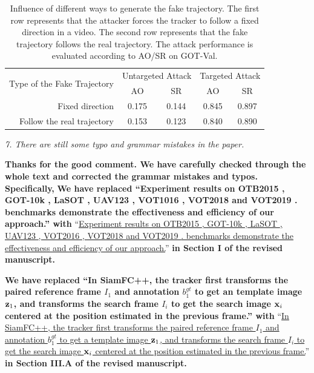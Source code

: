 \documentclass[12pt]{article}
\begin{document}
\begin{table}[t]
  \renewcommand\thetable{\ref{table:direction}}
  \centering
  \caption{Influence of different ways to generate the fake trajectory. The first row represents that the attacker forces the tracker to follow a fixed direction in a video.
  The second row represents that the fake trajectory follows the real trajectory. The attack performance is evaluated according to AO/SR on GOT-Val.}
  \begin{tabular}{@{}rcccc@{}}
  \toprule
  \multirow{2}{*}[-2pt]{Type of the Fake Trajectory} & \multicolumn{2}{c}{Untargeted Attack} & \multicolumn{2}{c}{Targeted Attack} \\ \cmidrule{2-5}
                              & AO                & SR                & AO               & SR               \\ \midrule
  Fixed direction             & 0.175             & 0.144             & 0.845            & 0.897            \\
  Follow the real trajectory  & 0.153             & 0.123             & 0.840            & 0.890            \\ \bottomrule        
  \end{tabular}
\end{table}

\textit{7. There are still some typo and grammar mistakes in the paper.}

\textbf{Thanks for the good comment. We have carefully checked through the whole text and corrected the grammar mistakes and typos. Specifically,}
\textbf{We have replaced ``Experiment results on OTB2015 \cite{OTB}, GOT-10k \cite{GOT-10k}, LaSOT \cite{GOT-10k}, UAV123 \cite{UAV123}, VOT1016 \cite{VOT2016}, VOT2018 \cite{VOT2018} and VOT2019 \cite{VOT2019}. benchmarks demonstrate the effectiveness and efficiency of our approach.'' with}
``\uline{Experiment results on OTB2015 \cite{OTB}, GOT-10k \cite{GOT-10k}, LaSOT \cite{LaSOT}, UAV123 \cite{UAV123}, VOT2016 \cite{VOT2016}, VOT2018 \cite{VOT2018} and VOT2019 \cite{VOT2019}. benchmarks demonstrate the effectiveness and efficiency of our approach.}''
\textbf{in Section I of the revised manuscript.}

\textbf{We have replaced ``In SiamFC++, the tracker first transforms the paired reference frame $I_1$ and annotation $b_1^{gt}$ to get an template image $\textbf z_1$, and transforms the search frame $I_i$ to get the search image $\textbf x_i$ centered at the position estimated in the previous frame.'' with}
``\uline{In SiamFC++, the tracker first transforms the paired reference frame $I_1$ and annotation $b_1^{gt}$ to get a template image $\textbf z_1$, and transforms the search frame $I_i$ to get the search image $\textbf x_i$ centered at the position estimated in the previous frame.}''
\textbf{in Section III.A of the revised manuscript.}
\end{document}

